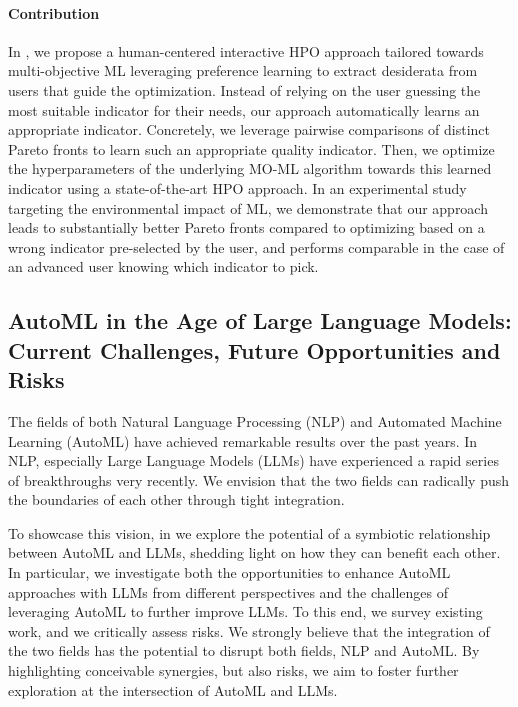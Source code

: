 \paragraph{Contribution} In , we propose a human-centered interactive HPO approach tailored towards multi-objective ML leveraging preference learning to extract desiderata from users that guide the optimization.
Instead of relying on the user guessing the most suitable indicator for their needs, our approach automatically learns an appropriate indicator.
Concretely, we leverage pairwise comparisons of distinct Pareto fronts to learn such an appropriate quality indicator.
Then, we optimize the hyperparameters of the underlying MO-ML algorithm towards this learned indicator using a state-of-the-art HPO approach.
In an experimental study targeting the environmental impact of ML, we demonstrate that our approach leads to substantially better Pareto fronts compared to optimizing based on a wrong indicator pre-selected by the user, and performs comparable in the case of an advanced user knowing which indicator to pick.


\subsection*{AutoML in the Age of Large Language Models: Current Challenges, Future Opportunities and Risks}

The fields of both Natural Language Processing (NLP) and Automated Machine Learning (AutoML) have achieved remarkable results over the past years.
In NLP, especially Large Language Models (LLMs) have experienced a rapid series of breakthroughs very recently.
We envision that the two fields can radically push the boundaries of each other through tight integration.

To showcase this vision, in  we explore the potential of a symbiotic relationship between AutoML and LLMs, shedding light on how they can benefit each other.
In particular, we investigate both the opportunities to enhance AutoML approaches with LLMs from different perspectives and the challenges of leveraging AutoML to further improve LLMs.
To this end, we survey existing work, and we critically assess risks.
We strongly believe that the integration of the two fields has the potential to disrupt both fields, NLP and AutoML.
By highlighting conceivable synergies, but also risks, we aim to foster further exploration at the intersection of AutoML and LLMs.

